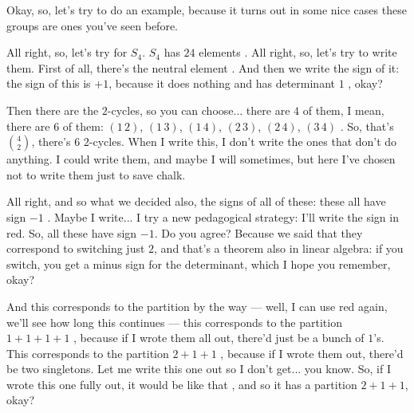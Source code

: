 \begin{speech}[00:29:38 - 00:31:56]
Okay, so, let's try to do an example, because it turns out in some nice cases these groups are ones you've seen before.

All right, so, let's try for $S_4$. $S_4$ has $24$ elements . All right, so, let's try to write them. First of all, there's the neutral element . And then we write the sign of it: the sign of this is $+1$, because it does nothing and has determinant $1$ , okay?

Then there are the $2$-cycles, so you can choose... there are $4$ of them, I mean, there are $6$ of them: $(1\,2)$, $(1\,3)$, $(1\,4)$, $(2\,3)$, $(2\,4)$, $(3\,4)$ . So, that's $\binom{4}{2}$, there's $6$ $2$-cycles. When I write this, I don't write the ones that don't do anything. I could write them, and maybe I will sometimes, but here I've chosen not to write them just to save chalk.

All right, and so what we decided also, the signs of all of these: these all have sign $-1$ . Maybe I write... I try a new pedagogical strategy: I'll write the sign in red. So, all these have sign $-1$. Do you agree? Because we said that they correspond to switching just $2$, and that's a theorem also in linear algebra: if you switch, you get a minus sign for the determinant, which I hope you remember, okay?

And this corresponds to the partition by the way --- well, I can use red again, we'll see how long this continues --- this corresponds to the partition $1+1+1+1$ , because if I wrote them all out, there'd just be a bunch of $1$'s. This corresponds to the partition $2+1+1$ , because if I wrote them out, there'd be two singletons. Let me write this one out so I don't get... you know. So, if I wrote this one fully out, it would be like that , and so it has a partition $2+1+1$, okay?
\end{speech}

